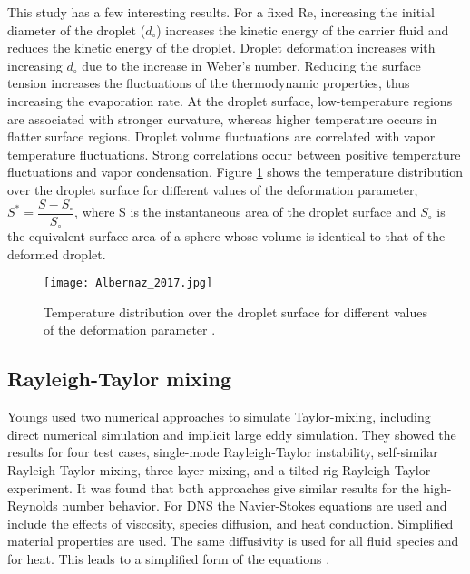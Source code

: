 \documentclass[12pt,oneside,a4paper,english]{article}
\begin{document}
This study has a few interesting results. For a fixed Re, increasing the initial diameter of the droplet ($d_{\circ}$) increases the kinetic energy of the carrier fluid and reduces the kinetic energy of the droplet. Droplet deformation increases with increasing $d_{\circ}$ due to the increase in Weber's number. Reducing the surface tension increases the fluctuations of the thermodynamic properties, thus increasing the evaporation rate. At the droplet surface, low-temperature regions are associated with stronger curvature, whereas higher temperature occurs in flatter surface regions. Droplet volume fluctuations are correlated with vapor temperature fluctuations. Strong correlations occur between positive temperature fluctuations and vapor condensation. Figure \ref{fig_Albernaz_2017_1} shows the temperature distribution over the droplet surface for different values of the deformation parameter, $S^* = \dfrac{S - S_{\circ}}{S_{\circ}}$, where S is the instantaneous area of the droplet surface and $S_{\circ}$ is the equivalent surface area of a sphere whose volume is identical to that of the deformed droplet.

\begin{figure}[H]
    \centering
    \texttt{[image: Albernaz\_2017.jpg]}
    \caption[Temperature distribution over the droplet surface]{Temperature distribution over the droplet surface for different values of the deformation parameter \cite{albernaz2017droplet}.}
    \label{fig_Albernaz_2017_1}
\end{figure}




\subsection{Rayleigh-Taylor mixing}
Youngs used two numerical approaches to simulate Taylor-mixing, including direct numerical simulation and implicit large eddy simulation. They showed the results for four test cases, single-mode Rayleigh-Taylor instability, self-similar Rayleigh-Taylor mixing, three-layer mixing, and a tilted-rig Rayleigh-Taylor experiment. It was found that both approaches give similar results for the high-Reynolds number behavior. For DNS the Navier-Stokes equations are used and include the effects of viscosity, species diffusion, and heat conduction. Simplified material properties are used. The same diffusivity is used for all fluid species and for heat. This leads to a simplified form of the equations \cite{youngs2017rayleigh}.
\end{document}
